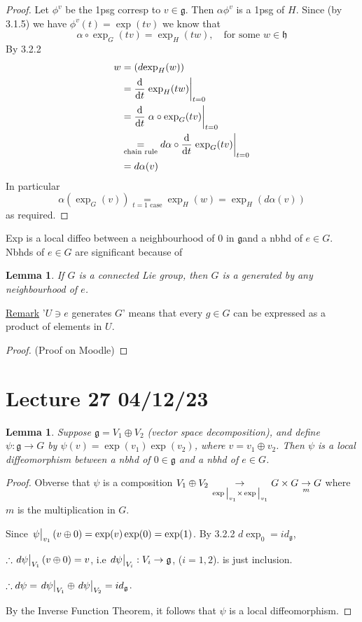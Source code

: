 \documentclass[12pt,a4paper]{article}
\newcommand{\dgq}[2]{\ensuremath{d {#1}_{#2}}}
\newcommand{\dg}[1]{\ensuremath{d {#1}}}
\newcommand{\lalg}{\ensuremath{\mathfrak{g}}}
\newcommand{\lall}[1]{\ensuremath{\mathfrak{#1}}}
\newcommand{\ul}[1]{\underline{#1}}
\newtheorem{lemma}[thm]{Lemma}
\begin{document}
\begin{proof}
Let $\phi^v$ be the 1psg corresp to $v\in \lalg$. Then $\alpha \phi^v$ is a 1psg of $H$. Since (by 3.1.5) we have $\phi^v(t)=\exp(tv)$ we know that
\[\alpha\circ \exp_G(tv)=\exp_H(tw), \quad \text{for some } w\in \lall{h}\]
By 3.2.2 
\begin{align*}
w&= \left(\dgq{\exp}{H}(w)\right)\\
&= \dv{t}\eval{\exp_H(tw)}_{t=0}\\
&= \dv{t}\eval{\alpha\circ\exp_G(tv)}_{t=0}\\
&\underset{\text{chain rule}}{=}\dg{\alpha}\circ \dv{t}\eval{\exp_G(tv)}_{t=0}\\
&=\dg{\alpha}(v)
\end{align*}
In particular
\[\alpha \left(\exp_G(v)\right)\underset{t=1 \text{ case}}{=} \exp_H(w)=\exp_H(\dg{\alpha}(v))\]
as required.
\end{proof}
Exp is a local diffeo between a neighbourhood of $0$ in \lalg and a nbhd of $e\in G$. Nbhds of $e\in G$ are significant because of 
\begin{lemma}
If $G$ is a connected Lie group, then $G$ is a generated by any neighbourhood of $e$.
\end{lemma}
\ul{Remark} '$U\ni e$ generates $G$' means that every $g\in G$ can be expressed as a product of elements in $U$.
\begin{proof}
(Proof on Moodle)
\end{proof}
\section{Lecture 27 04/12/23}
\begin{lemma}
Suppose $\lalg=V_1 \oplus V_2$ (vector space decomposition), and define $\psi:\lalg \to G$ by $\psi(v)=\exp(v_1)\exp(v_2)$, where $v=v_1\oplus v_2$. Then $\psi$ is a local diffeomorphism between a nbhd of $0\in \lalg$ and a nbhd of $e\in G$.
\end{lemma}
\begin{proof}
Obverse that $\psi$ is a composition $V_1\oplus V_2\underset{\eval{\exp}_{v_1}\times \eval{\exp}_{v_1}}{\to} G\times G \underset{m}{\to} G$ where $m$ is the multiplication in $G$.

Since $\eval{\psi}_{v_1}(v\oplus 0) = \exp(v)\exp(0)=\exp(1)$. By 3.2.2 $\dgq{\exp}{0}=id_{\lalg}$, 

$\therefore \eval{\dg{\psi}}_{V_1}(v\oplus 0)=v$, i.e $\eval{\dg{\psi}}_{V_i}:V_i\to \lalg$, ($i=1,2$). is just inclusion.

$\therefore \dg{\psi}= \eval{\dg{\psi}}_{V_1}\oplus  \eval{\dg{\psi}}_{V_2}=id_{\lalg}$.

By the Inverse Function Theorem, it follows that $\psi$ is a local diffeomorphism.
\end{proof}
\end{document}
